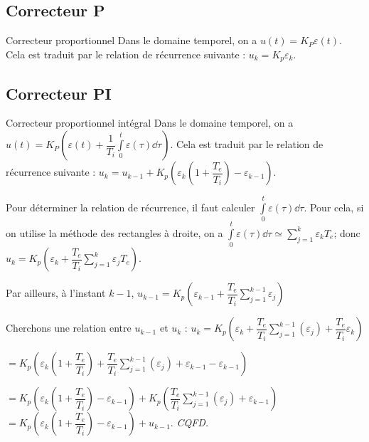  
\subsection{Correcteur P}
\begin{defi}{Correcteur proportionnel}
Dans le domaine temporel, on a $u(t)=K_P \varepsilon(t)$. Cela est traduit par le relation de récurrence suivante : 
$u_k = K_p \varepsilon_k$.
\end{defi}
\subsection{Correcteur PI}
\begin{defi}{Correcteur proportionnel intégral}
Dans le domaine temporel, on a $u(t)=K_P  \left(\varepsilon(t)+\dfrac{1}{T_i}\int\limits_0^t \varepsilon(\tau) \dd \tau \right)$. Cela est traduit par le relation de récurrence suivante : 
$u_k = u_{k-1} +  K_p \left( \varepsilon_k \left( 1+\dfrac{T_e}{T_i}\right) - \varepsilon_{k-1} \right)$.
\end{defi}

\begin{demo}
Pour déterminer la relation de récurrence, il faut calculer $\int\limits_0^t \varepsilon(\tau) \dd \tau$. 
Pour cela, si on utilise la méthode des rectangles à droite, on a 
$\int\limits_0^t \varepsilon(\tau) \dd \tau \simeq \sum\limits_{j=1}^k \varepsilon_k T_e$; donc 
$u_k = K_p\left(\varepsilon_k + \dfrac{T_e}{T_i}\sum\limits_{j=1}^k \varepsilon_j T_e\right)$.

Par ailleurs, à l'instant $k-1$, $u_{k-1} = K_p\left(\varepsilon_{k-1} + \dfrac{T_e}{T_i}\sum\limits_{j=1}^{k-1} \varepsilon_j \right)$


Cherchons une relation entre $u_{k-1}$ et $u_{k}$ : 
$u_k = K_p\left(\varepsilon_k + \dfrac{T_e}{T_i}\sum\limits_{j=1}^{k-1} \left(\varepsilon_j \right) + \dfrac{T_e}{T_i} \varepsilon_k \right)$

$= K_p\left(\varepsilon_k \left(1+\dfrac{T_e}{T_i}\right)+ \dfrac{T_e}{T_i}\sum\limits_{j=1}^{k-1} \left(\varepsilon_j \right) + \varepsilon_{k-1} - \varepsilon_{k-1}\right)$

$= K_p\left(\varepsilon_k \left(1+\dfrac{T_e}{T_i}\right) - \varepsilon_{k-1}\right)
+ K_p\left(\dfrac{T_e}{T_i}\sum\limits_{j=1}^{k-1} \left(\varepsilon_j \right) + \varepsilon_{k-1} \right) $
$= K_p\left(\varepsilon_k \left(1+\dfrac{T_e}{T_i}\right) - \varepsilon_{k-1}\right) + u_{k-1} $. \textit{CQFD.}
\end{demo}


